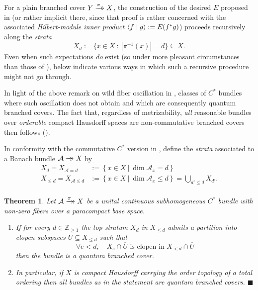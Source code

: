 \documentclass[11pt,leqno]{article}
\theoremstyle{plain}
\theoremstyle{plain}
\newtheorem{theoremN}{Theorem}
\theoremstyle{plain}
\numberwithin{equation}{section}
\theoremstyle{nonumberplain}
\newcommand\bZ{{\mathbb Z}}
\newcommand\cA{{\mathcal A}}
\newcommand\1{{\bf 1}}
\newcommand{\qedhere}{\mbox{}\hfill\ensuremath{\blacksquare}}
\newcommand{\xrightarrowdbl}[2][]{%
  \xrightarrow[#1]{#2}\mathrel{\mkern-14mu}\rightarrow
}
\begin{document}
For a plain branched cover $Y\xrightarrowdbl{\pi}X$, the construction of the desired $E$ proposed in \cite[Theorem 4.3]{pt_brnch} (or rather implicit there, since that proof is rather concerned with the associated {\it Hilbert-module inner product} \cite[Definition 15.1.1]{wo} $\braket{f\mid g}:=E(f^*g)$) proceeds recursively along the {\it strata}
\begin{equation*}
  X_d
  :=
  \{x\in X\ :\ |\pi^{-1}(x)|=d\}
  \subseteq X.
\end{equation*}
Even when such expectations {\it do} exist (so under more pleasant circumstances than those of ),  below indicate various ways in which such a recursive procedure might not go through. 

In light of the above remark on wild fiber oscillation in ,  classes of $C^*$ bundles where such oscillation does not obtain and which are consequently quantum branched covers. The fact that, regardless of metrizability, {\it all} reasonable bundles over {\it orderable} compact Hausdorff spaces are non-commutative branched covers then follows (). 

In conformity with the commutative $C^*$ version in \cite[post Lemma 2.3]{pt_brnch}, define the {\it strata} associated to a Banach bundle $\cA\xrightarrowdbl{}X$ by
\begin{equation}\label{eq:strata}
  \begin{aligned}
    X_{d}=X_{\cA=d}
    &:=
      \left\{x\in X\ |\ \dim \cA_x=d\right\}\\
    X_{\le d}=X_{\cA\le d}
    &:=
      \left\{x\in X\ |\ \dim \cA_x\le d\right\}
      =\bigcup_{d'\le d}X_{d'}.\\
  \end{aligned}    
\end{equation}


\begin{theoremN}\label{thn:well.stratified}
  Let $\cA\xrightarrowdbl{\pi}X$ be a unital continuous subhomogeneous $C^*$ bundle with non-zero fibers over a paracompact base space. 
  \begin{enumerate}[(1),wide]
  \item If for every $d\in \bZ_{\ge 1}$ the top stratum $X_d$ in $X_{\le d}$ admits a partition into clopen subspaces $U\subseteq X_{\le d}$ such that
    \begin{equation*}
      \forall e<d
      ,\quad
      X_e\cap \overline{U}
      \text{ is clopen in }X_{<d}\cap\overline{U}
    \end{equation*}
    then the bundle is a quantum branched cover. 

  \item In particular, if $X$ is compact Hausdorff carrying the {\it order topology} \cite[\S 14]{mnk} of a total ordering then all bundles as in the statement are quantum branched covers.  \qedhere
  \end{enumerate}
\end{theoremN}
\end{document}

